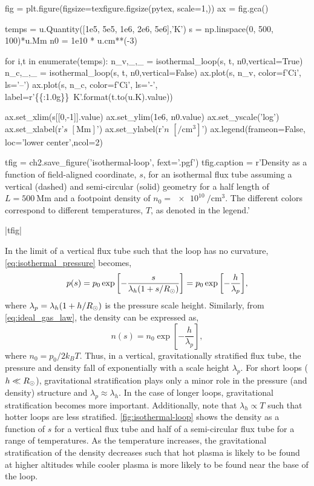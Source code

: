 \begin{pycode}[chapter2]
fig = plt.figure(figsize=texfigure.figsize(pytex, scale=1,))
ax = fig.gca()

temps = u.Quantity([1e5, 5e5, 1e6, 2e6, 5e6],'K')
s = np.linspace(0, 500, 100)*u.Mm
n0 = 1e10 * u.cm**(-3)

for i,t in enumerate(temps):
    n_v,_,_ = isothermal_loop(s, t, n0,vertical=True)
    n_c,_,_ = isothermal_loop(s, t, n0,vertical=False)
    ax.plot(s, n_v, color=f'C{i}', ls='--')
    ax.plot(s, n_c, color=f'C{i}', ls='-',
            label=r'\SI{{{:1.0g}}}{{\kelvin}}'.format(t.to(u.K).value))

ax.set_xlim(s[[0,-1]].value)
ax.set_ylim(1e6, n0.value)
ax.set_yscale('log')
ax.set_xlabel(r'$s$ $[\si{\mega\m}]$')
ax.set_ylabel(r'$n$ $[\si{\per\cubic\cm}]$')
ax.legend(frameon=False, loc='lower center',ncol=2)

tfig = ch2.save_figure('isothermal-loop', fext='.pgf')
tfig.caption = r'Density as a function of field-aligned coordinate, $s$, for an isothermal flux tube assuming a vertical (dashed) and semi-circular (solid) geometry for a half length of $L=\SI{500}{\mega\m}$ and a footpoint density of $n_0=\SI{e10}{\per\cubic\cm}$. The different colors correspond to different temperatures, $T$, as denoted in the legend.'
\end{pycode}
\py[chapter2]|tfig|

In the limit of a vertical flux tube such that the loop has no curvature, \autoref{eq:isothermal_pressure} becomes,
\begin{equation}\label{eq:isothermal_pressure_vertical}
    p(s) = p_0\exp{\left[-\frac{s}{\lambda_h(1 + s/R_\odot)}\right]} = p_0\exp{\left[-\frac{h}{\lambda_p}\right]},
\end{equation}
where $\lambda_p=\lambda_h(1 + h/R_\odot)$ is the pressure scale height. Similarly, from \autoref{eq:ideal_gas_law}, the density can be expressed as,
\begin{equation*}
    n(s) = n_0\exp{\left[-\frac{h}{\lambda_p}\right]},
\end{equation*} 
where $n_0=p_0/2k_BT$. Thus, in a vertical, gravitationally stratified flux tube, the pressure and density fall of exponentially with a scale height $\lambda_p$. For short loops ($h\ll R_\odot$), gravitational stratification plays only a minor role in the pressure (and density) structure and $\lambda_p\approx\lambda_h$. In the case of longer loops, gravitational stratification becomes more important. Additionally, note that $\lambda_h\propto T$ such that hotter loops are less stratified. \autoref{fig:isothermal-loop} shows the density as a function of $s$ for a vertical flux tube and half of a semi-circular flux tube for a range of temperatures. As the temperature increases, the gravitational stratification of the density decreases such that hot plasma is likely to be found at higher altitudes while cooler plasma is more likely to be found near the base of the loop.

